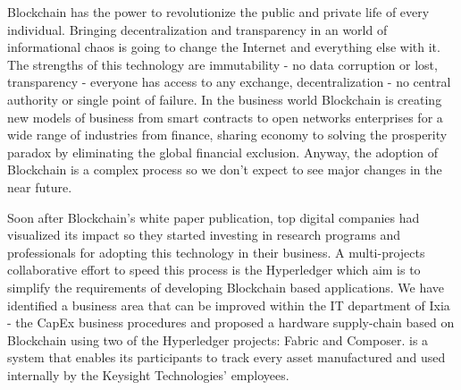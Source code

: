 
Blockchain has the power to revolutionize the public and private life of every individual. Bringing decentralization and transparency in an world of informational chaos is going to change the Internet and everything else with it. The strengths of this technology are immutability - no data corruption or lost, transparency - everyone has access to any exchange, decentralization - no central authority or single point of failure. In the business world Blockchain is creating new models of business from smart contracts to open networks enterprises for a wide range of industries from finance, sharing economy to solving the prosperity paradox by eliminating the global financial exclusion. Anyway, the adoption of Blockchain is a complex process so we don't expect to see major changes in the near future.

Soon after Blockchain's white paper publication, top digital companies had visualized its impact so they started investing in research programs and professionals for adopting this technology in their business. A multi-projects collaborative effort to speed this process is the Hyperledger which aim is to simplify the requirements of developing Blockchain based applications. We have identified a business area that can be improved within the IT department of Ixia - the CapEx business procedures and proposed a hardware supply-chain based on Blockchain using two of the Hyperledger projects: Fabric and Composer. \emph{\project} is a system that enables its participants to track every asset manufactured and used internally by the Keysight Technologies' employees.
